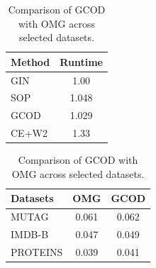\begin{table}[htbp]
    \begin{minipage}{0.5\linewidth}
        \caption{Runtime comparison on PPA (30\% of data, 6 classes).}
        \label{tab:runtime_comparison}
        \centering
        \begin{tabular}{lc}
            \hline
            \textbf{Method} & \textbf{Runtime} \\
            \hline
            GIN  & 1.00 \\
            SOP  & 1.048 \\
            GCOD & 1.029 \\
            CE+W2 & 1.33 \\
            \hline
        \end{tabular}
       
    \end{minipage}%
    \begin{minipage}{0.5\linewidth}
        \centering
        \caption{Comparison of GCOD with OMG across selected datasets.}
        \label{tab:omg_table}
        \begin{tabular}{lcc}
            \hline
            \textbf{Datasets} & \textbf{OMG} & \textbf{GCOD} \\
            \hline
            MUTAG              & 0.061        & 0.062 \\
            IMDB-B             & 0.047        & 0.049 \\
            PROTEINS           & 0.039        & 0.041 \\
            \hline
        \end{tabular}
       
    \end{minipage}
\end{table}


